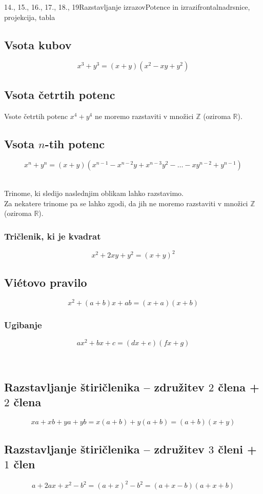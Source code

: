 \begin{priprava}{14., 15., 16., 17., 18., 19}{}{Razstavljanje izrazov}{Potence in izrazi}{frontalna}{drsnice, projekcija, tabla}
    
        \subsection*{Vsota kubov}
        $$ x^3+y^3=(x+y)(x^2-xy+y^2) $$
        

        \subsection*{Vsota četrtih potenc}
        Vsote četrtih potenc $x^4+y^4$ ne moremo razstaviti v množici $\mathbb{Z}$ (oziroma $\mathbb{R}$).
    

        \subsection*{Vsota $n$-tih potenc}
        $$x^n+y^n=(x+y)(x^{n-1}-x^{n-2}y+x^{n-3}y^2-\ldots-xy^{n-2}+y^{n-1})$$
        ~\newline
    
            
        Trinome, ki sledijo naslednjim oblikam lahko razstavimo. \\
        Za nekatere trinome pa se lahko zgodi, da jih ne moremo razstaviti v množici $\mathbb{Z}$ (oziroma $\mathbb{R}$).
        
        \subsubsection*{Tričlenik, ki je kvadrat}
            $$x^2+2xy+y^2=(x+y)^2$$
        

        \subsection*{Vi\'etovo pravilo}
        $$x^2+(a+b)x+ab=(x+a)(x+b)$$
    

        \subsubsection*{Ugibanje}
        $$ax^2+bx+c=(dx+e)(fx+g) $$
        
        
    ~
        \subsection*{Razstavljanje štiričlenika -- združitev $2$ člena + $2$ člena}
        $$xa+xb+ya+yb=x(a+b)+y(a+b)=(a+b)(x+y)$$
    

        \subsection*{Razstavljanje štiričlenika -- združitev $3$ členi + $1$ člen}
        $$a+2ax+x^2-b^2=(a+x)^2-b^2=(a+x-b)(a+x+b)$$
            

\end{priprava}
